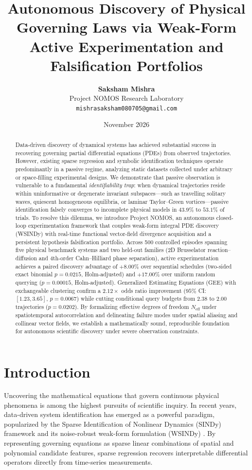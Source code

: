 \documentclass[twocolumn,10pt,a4paper]{article}
\title{\textbf{Autonomous Discovery of Physical Governing Laws via Weak-Form Active Experimentation and Falsification Portfolios}}
\author{
    \textbf{Saksham Mishra} \\
    Project NOMOS Research Laboratory \\
    \texttt{mishrasaksham080705@gmail.com}
}
\date{November 2026}
\begin{document}
\maketitle

\begin{abstract}
Data-driven discovery of dynamical systems has achieved substantial success in recovering governing partial differential equations (PDEs) from observed trajectories. However, existing sparse regression and symbolic identification techniques operate predominantly in a passive regime, analyzing static datasets collected under arbitrary or space-filling experimental designs. We demonstrate that passive observation is vulnerable to a fundamental \emph{identifiability trap}: when dynamical trajectories reside within uninformative or degenerate invariant subspaces---such as travelling solitary waves, quiescent homogeneous equilibria, or laminar Taylor--Green vortices---passive identification falsely converges to incomplete physical models in $43.9\%$ to $53.1\%$ of trials. To resolve this dilemma, we introduce Project NOMOS, an autonomous closed-loop experimentation framework that couples weak-form integral PDE discovery (WSINDy) with real-time functional vector-field divergence acquisition and a persistent hypothesis falsification portfolio. Across 500 controlled episodes spanning five physical benchmark systems and two held-out families (2D Brusselator reaction--diffusion and 4th-order Cahn--Hilliard phase separation), active experimentation achieves a paired discovery advantage of $+8.00\%$ over sequential schedules (two-sided exact binomial $p = 0.0215$, Holm-adjusted) and $+17.00\%$ over uniform random querying ($p = 0.00015$, Holm-adjusted). Generalized Estimating Equations (GEE) with exchangeable clustering confirm a $2.12\times$ odds ratio improvement ($95\%$ CI: $[1.23, 3.65]$, $p = 0.0067$) while cutting conditional query budgets from $2.38$ to $2.00$ trajectories ($p = 0.0202$). By formalizing effective degrees of freedom $N_{\text{eff}}$ under spatiotemporal autocorrelation and delineating failure modes under spatial aliasing and collinear vector fields, we establish a mathematically sound, reproducible foundation for autonomous scientific discovery under severe observation constraints.
\end{abstract}

\section{Introduction}
Uncovering the mathematical equations that govern continuous physical phenomena is among the highest pursuits of scientific inquiry. In recent years, data-driven system identification has emerged as a powerful paradigm, popularized by the Sparse Identification of Nonlinear Dynamics (SINDy) framework \cite{brunton2016discovering, desilva2020pysindy} and its noise-robust weak-form formulation (WSINDy) \cite{schaeffer2017learning, messenger2021weak}. By representing governing equations as sparse linear combinations of spatial and polynomial candidate features, sparse regression recovers interpretable differential operators directly from time-series measurements.
\end{document}

